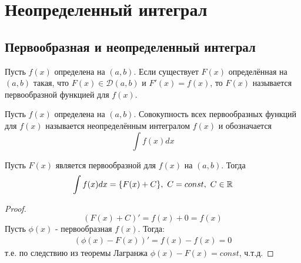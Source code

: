 \section{Неопределенный интеграл}
\subsection{Первообразная и неопределенный интеграл}
\begin{definition}
    Пусть $f(x)$ определена на $(a, b)$. Если существует $F(x)$ определённая на $(a, b)$ такая, что $F(x) \in \mathcal{D}(a, b)$ и $F'(x) = f(x)$, то $F(x)$ называется первообразной функцией для $f(x)$.
\end{definition}
\begin{definition}
    Пусть $f(x)$ определена на $(a, b)$. Совокупность всех первообразных функций для $f(x)$ называется неопределённым интегралом $f(x)$ и обозначается 
    \[\int f(x)dx\]
\end{definition}
\begin{theorem}
    Пусть $F(x)$ является первообразной для $f(x)$ на $(a, b)$. Тогда
    \[\int f(x)dx = \{F(x) + C\},\ C = const, \ C\in\mathbb{R}\]
\end{theorem}
\begin{proof}
    \[(F(x) + C)' = f(x) + 0 = f(x)\]
    Пусть $\phi(x)$ -  первообразная $f(x)$. Тогда:
    \begin{align*}
        (\phi(x) - F(x))' = f(x) - f(x) = 0
    \end{align*}
    т.е. по следствию из теоремы Лагранжа $\phi(x) - F(x) = const$, ч.т.д.
\end{proof}
